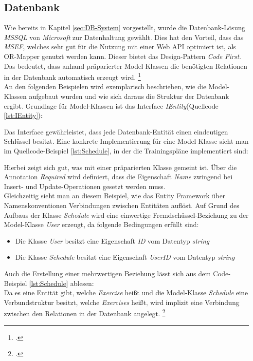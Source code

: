 \subsection{Datenbank}
\label{ssec:aufbau-server-db}
Wie bereits in Kapitel \ref{sec:DB-System} vorgestellt, wurde die Datenbank-Lösung \textit{\ac{MSSQL}} von \textit{Microsoft} zur Datenhaltung gewählt. Dies hat den Vorteil, dass das \textit{\gls{MSEF}}, welches sehr gut für die Nutzung mit einer Web \ac{API} optimiert ist, als \gls{OR-Mapper} genutzt werden kann. Dieser bietet das Design-Pattern \textit{Code First}. Das bedeutet, dass anhand präparierter Model-Klassen die benötigten Relationen in der Datenbank automatisch erzeugt wird. \footcite{entity-framework-code-first}\\
An den folgenden Beispielen wird exemplarisch beschrieben, wie die Model-Klassen aufgebaut wurden und wie sich daraus die Struktur der Datenbank ergibt. Grundlage für Model-Klassen ist das Interface \textit{IEntity}(Quellcode \ref{lst:IEntity}):

Das Interface gewährleistet, dass jede Datenbank-Entität einen eindeutigen Schlüssel besitzt.
Eine konkrete Implementierung für eine Model-Klasse sieht man im \linebreak Quellcode-Beispiel \ref{lst:Schedule}, in der die Trainingspläne implementiert sind:

Hierbei zeigt sich gut, was mit einer präparierten Klasse gemeint ist. Über die Annotation \textit{Required} wird definiert, dass die Eigenschaft \textit{Name} zwingend bei Insert- und Update-Operationen gesetzt werden muss. \\
Gleichzeitig sieht man an diesem Beispiel, wie das Entity Framework über Namenskonventionen Verbindungen zwischen Entitäten auflöst. Auf Grund des Aufbaus der Klasse \textit{Schedule} wird eine einwertige Fremdschüssel-Beziehung zu der Model-Klasse \textit{User} erzeugt, da folgende Bedingungen erfüllt sind:
\begin{itemize}
\item Die Klasse \textit{User} besitzt eine Eigenschaft \textit{ID} vom Datentyp \textit{string}
\item Die Klasse \textit{Schedule} besitzt eine Eigenschaft \textit{UserID} vom Datentyp \textit{string}
\end{itemize}
Auch die Erstellung einer mehrwertigen Beziehung lässt sich aus dem Code-Beispiel \ref{lst:Schedule} ablesen: \\
Da es eine Entität gibt, welche \textit{Exercise} heißt und die Model-Klasse \textit{Schedule} eine Verbundstruktur besitzt, welche \textit{Exercises} heißt, wird implizit eine Verbindung zwischen den Relationen in der Datenbank angelegt. \footcite{entity-framework-code-first}
